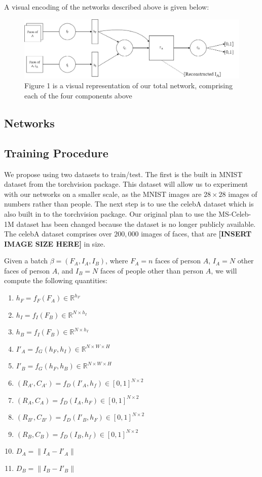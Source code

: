 \documentclass{article}
\begin{document}
A visual encoding of the networks described above is given below:
\begin{figure}[hbt]
    \centering
    \includegraphics[scale=0.25]{images/OurNetwork.png}
    \caption{Figure 1 is a visual representation of our total network, comprising each of the four components above}
    \label{fig:my_label}
\end{figure}

\subsection{Networks}

\subsection{Training Procedure}

We propose using two datasets to train/test. The first is the built in MNIST dataset from the torchvision package. This dataset will allow us to experiment with our networks on a smaller scale, as the MNIST images are $28 \times 28$ images of numbers rather than people. The next step is to use the celebA dataset which is also built in to the torchvision package. Our original plan to use the MS-Celeb-1M dataset \cite{guo2016ms} 
has been changed because the dataset is no longer publicly available. The celebA dataset comprises over $200,000$ images of faces, that are \textbf{[INSERT IMAGE SIZE HERE]} in size.

Given a batch $\beta = (F_A, I_A, I_B)$, where $F_A = n$ faces of person $A$, $I_A = N$ other faces of person $A$, and $I_B = N $ faces of people other than person $A$, we will compute the following quantities:
\begin{enumerate}
    \item $h_F = f_F(F_A) \in \mathbb{R}^{h_F}$
    \item $h_I = f_I(F_B) \in \mathbb{R}^{N \times h_I}$
    \item $h_B = f_I(F_B) \in \mathbb{R}^{N \times h_I}$
    \item $I'_A = f_G(h_F, h_I) \in \mathbb{R}^{N \times W \times H}$
    \item $I'_B = f_G(h_F, h_B) \in \mathbb{R}^{N \times W \times H}$
    \item $(R_{A'}, C_{A'}) = f_D(I'_A, h_f) \in [0,1]^{N \times 2}$
    \item $(R_A, C_A) = f_D(I_A, h_F) \in [0,1]^{N \times 2}$
    \item $(R_{B'}, C_{B'}) = f_D(I'_B, h_F) \in [0,1]^{N \times 2}$
    \item $(R_B, C_B) = f_D(I_B, h_f) \in [0,1]^{N \times 2}$
    \item $D_A = \|I_A - I'_A\|$
    \item $D_B = \|I_B - I'_B\|$
\end{enumerate}
\end{document}
